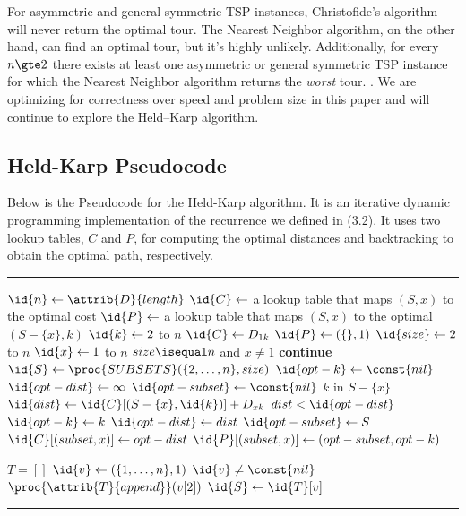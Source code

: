 \documentclass[11pt,fleqn]{article}
\begin{document}
For asymmetric and general symmetric TSP instances, Christofide's algorithm will
never return the optimal tour.  The Nearest Neighbor algorithm, on the other hand,
can find an optimal tour, but it's highly unlikely.  Additionally, for every $n\gte 2$
there exists at least one asymmetric or general symmetric TSP instance for which the
Nearest Neighbor algorithm returns the \textit{worst} tour. \cite{gutin}.  We are
optimizing for correctness over speed and problem size in this paper and will continue
to explore the Held--Karp algorithm.

\subsection{Held-Karp Pseudocode}
Below is the Pseudocode for the Held-Karp algorithm.  It is an iterative
dynamic programming implementation of the recurrence we defined in (3.2).
It uses two lookup tables, $C$ and $P$, for computing the optimal distances
and backtracking to obtain the optimal path, respectively.
\par

\vspace{.27cm}
\hrule
\begin{codebox}
\li $\id{n} \gets \attrib{D}{length}$
\li $\id{C} \gets$ a lookup table that maps $(S, x)$ to the optimal cost
\li $\id{P} \gets$ a lookup table that maps $(S, x)$ to the optimal $(S-\{x\}, k)$
\li
\li \For $\id{k} \gets 2$ to $n$
\li   \Do
	$\id{C} \gets D_{1k}$
\li     $\id{P} \gets (\{\}, 1)$
      \End
\li
\li \For $\id{size} \gets 2$ to $n$
\li   \Do
	\For $\id{x} \gets 1$ to $n$
\li	  \Do
	    \If $size \isequal n$ and $x \neq 1$
\li	      \Then
		\textbf{continue}
	      \End
\li	    \For $\id{S} \gets \proc{SUBSETS}(\{2,\dots,n\}, size)$
\li	      \Do
		$\id{opt-k} \gets \const{nil}$
\li		$\id{opt-dist} \gets \infty$
\li		$\id{opt-subset} \gets \const{nil}$
\li		\For $k$ in $S-\{x\}$
\li		  \Do
		    $\id{dist} \gets \id{C}[(S-\{x\}, \id{k})] + D_{xk}$
\li		    \If $dist < \id{opt-dist}$
\li		      \Then
			$\id{opt-k} \gets k$
\li			$\id{opt-dist} \gets dist$
\li			$\id{opt-subset} \gets S$
		      \End
		  \End
\li
\li		  $\id{C}[(subset, x)] \gets opt-dist$
\li		  $\id{P}[(subset, x)] \gets (opt-subset, opt-k)$
	      \End
	  \End
      \End

\li
\li $T = []$
\li $\id{v} \gets (\{1,\dots,n\}, 1)$
\li \While $\id{v} \neq \const{nil}$
\li   \Do
	$\proc{\attrib{T}{append}}(v[2])$
\li	$\id{S} \gets \id{T}[v]$
      \End	
\li
\li \Return {}
\end{codebox}
\vspace{.27cm}
\hrule
\end{document}
